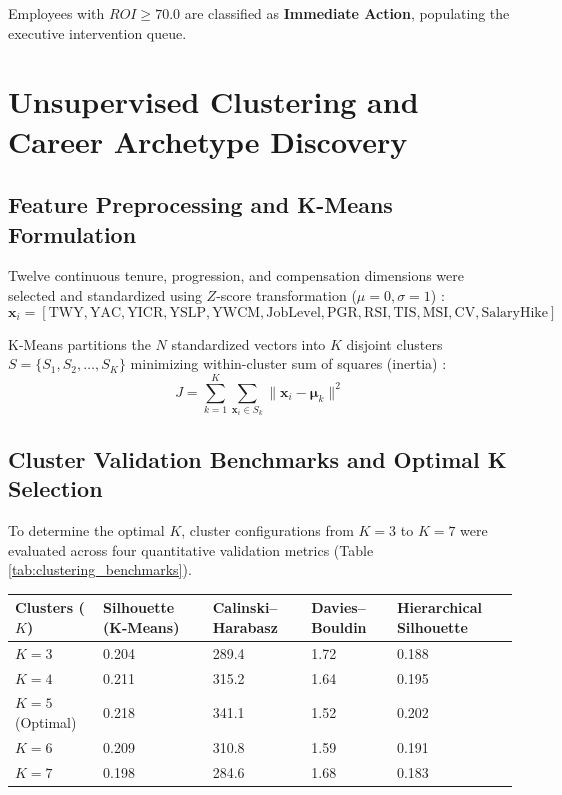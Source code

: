 \documentclass[12pt,a4paper,oneside]{article}
\begin{document}
Employees with $ROI \ge 70.0$ are classified as \textbf{Immediate Action}, populating the executive intervention queue.

\section{Unsupervised Clustering and Career Archetype Discovery}

\subsection{Feature Preprocessing and K-Means Formulation}
Twelve continuous tenure, progression, and compensation dimensions were selected and standardized using $Z$-score transformation ($\mu = 0, \sigma = 1$) \cite{ref_pedregosa_sklearn}:
$$\mathbf{x}_i = [\text{TWY}, \text{YAC}, \text{YICR}, \text{YSLP}, \text{YWCM}, \text{JobLevel}, \text{PGR}, \text{RSI}, \text{TIS}, \text{MSI}, \text{CV}, \text{SalaryHike}]$$

K-Means partitions the $N$ standardized vectors into $K$ disjoint clusters $S = \{S_1, S_2, \dots, S_K\}$ minimizing within-cluster sum of squares (inertia) \cite{ref_macqueen_kmeans}:
$$J = \sum_{k=1}^{K} \sum_{\mathbf{x}_i \in S_k} \|\mathbf{x}_i - \boldsymbol{\mu}_k\|^2$$

\subsection{Cluster Validation Benchmarks and Optimal K Selection}
To determine the optimal $K$, cluster configurations from $K=3$ to $K=7$ were evaluated across four quantitative validation metrics (Table \ref{tab:clustering_benchmarks}).

\begin{center}
\fontsize{9}{11}\selectfont
\begin{tabular}{|C{1.8cm}|C{2.6cm}|C{2.6cm}|C{2.6cm}|C{3.2cm}|}
\hline
\textbf{Clusters ($K$)} & \textbf{Silhouette (K-Means)} & \textbf{Calinski--Harabasz} & \textbf{Davies--Bouldin} & \textbf{Hierarchical Silhouette} \\ \hline
$K=3$ & 0.204 & 289.4 & 1.72 & 0.188 \\ \hline
$K=4$ & 0.211 & 315.2 & 1.64 & 0.195 \\ \hline
$K=5$ (Optimal) & 0.218 & 341.1 & 1.52 & 0.202 \\ \hline
$K=6$ & 0.209 & 310.8 & 1.59 & 0.191 \\ \hline
$K=7$ & 0.198 & 284.6 & 1.68 & 0.183 \\ \hline
\end{tabular}
\vspace{0.02in}
\label{tab:clustering_benchmarks}
\end{center}
\end{document}
